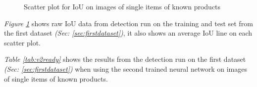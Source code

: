 \begin{figure}[h]
    \hfill
    \caption{Scatter plot for IoU on images of single items of known products} %
    \label{figure: v2knownproducts}
\end{figure}
\textit{Figure \ref{figure: v2knownproducts}} shows raw IoU data from detection run on the training and test set from the first dataset \textit{(Sec: \ref{sec:firstdataset})}, it also shows an average IoU line on each scatter plot.

\begin{table}[h]
\caption{Detection results when tested on trained data using the  second neural network}
\label{tab:v2ready}
\end{table}
\textit{Table \ref{tab:v2ready}} shows the results from the detection run on the first dataset \textit{(Sec: \ref{sec:firstdataset})} when using the second trained neural network on images of single items of known products.

